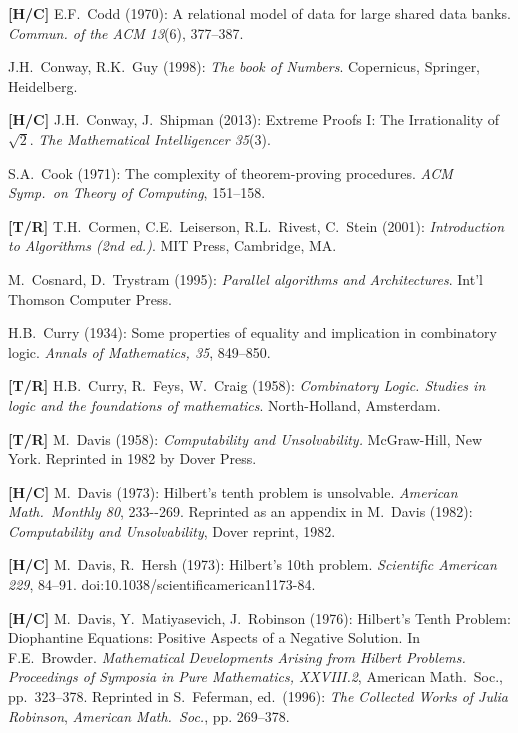 \begin{thebibliography}{999}
{\bf [H/C]}
E.F.~Codd (1970):
A relational model of data for large shared data banks.
{\it Commun. of the ACM 13}(6), 377--387.

J.H.~Conway, R.K.~Guy (1998):
{\it The book of Numbers}.
Copernicus, Springer, Heidelberg.

{\bf [H/C]}
J.H.~Conway, J.~Shipman (2013):
Extreme Proofs I: The Irrationality of $\sqrt{2}$.
{\it The Mathematical Intelligencer 35}(3).

S.A.~Cook (1971): The complexity of theorem-proving procedures.  {\it ACM Symp.~on Theory of Computing}, 151--158.

{\bf [T/R]}
T.H.~Cormen, C.E.~Leiserson, R.L.~Rivest, C.~Stein (2001):
{\it Introduction to Algorithms (2nd ed.)}.
MIT Press, Cambridge, MA.

M.~Cosnard, D.~Trystram (1995):
{\it Parallel algorithms and Architectures}.
Int'l Thomson Computer Press.

H.B.~Curry (1934): Some properties of equality and implication in combinatory logic.  {\it Annals of Mathematics, 35}, 849--850.

{\bf [T/R]}
H.B.~Curry, R.~Feys, W.~Craig (1958): {\it Combinatory Logic.  Studies in logic and the foundations of mathematics}.  North-Holland, Amsterdam.


{\bf [T/R]}
M.~Davis (1958): {\it Computability and Unsolvability.}
McGraw-Hill, New York.  Reprinted in 1982 by Dover Press.

{\bf [H/C]}
M.~Davis (1973):
Hilbert's tenth problem is unsolvable.
{\it American Math.~Monthly 80}, 233--269.  Reprinted as an appendix
in M.~Davis (1982): {\it Computability and Unsolvability}, Dover reprint, 1982.

{\bf [H/C]}
M.~Davis, R.~Hersh (1973): Hilbert's 10th problem.  {\it Scientific American 229},
84--91.  doi:10.1038/scientificamerican1173-84.

{\bf [H/C]}
M.~Davis, Y.~Matiyasevich, J.~Robinson (1976): Hilbert's Tenth Problem: Diophantine Equations: Positive Aspects of a Negative Solution.  In F.E.~Browder.  {\it Mathematical Developments Arising from Hilbert Problems.}  {\it Proceedings of Symposia in Pure Mathematics, XXVIII.2}, American Math.~Soc., pp.~323--378.  Reprinted in S.~Feferman, ed.~(1996): {\it The Collected Works of Julia Robinson}, {\it American Math.~Soc.}, pp. 269--378.


\end{thebibliography}
